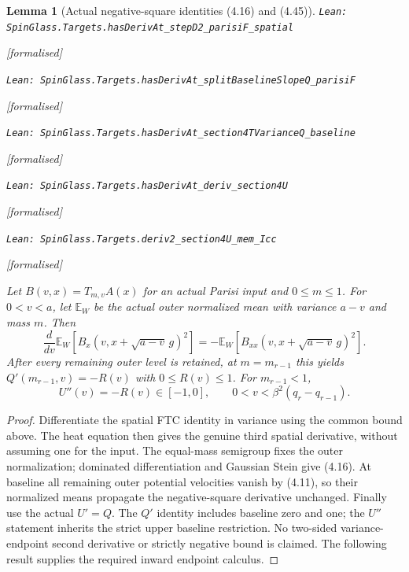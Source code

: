 \documentclass[11pt]{article}
\providecommand{\lean}[1]{\leavevmode\par\nopagebreak
  {\noindent\normalfont\footnotesize\raggedright\texttt{Lean: #1}\par}\nopagebreak}
\providecommand{\leanok}{\par\nopagebreak
  {\noindent\normalfont\footnotesize\textcolor{green!50!black}{[formalised]}\par}\nopagebreak}
\newtheorem{lemma}[theorem]{Lemma}
\begin{document}
\begin{lemma}[Actual negative-square identities (4.16) and (4.45)]
\lean{SpinGlass.Targets.hasDerivAt\_stepD2\_parisiF\_spatial}\leanok
\lean{SpinGlass.Targets.hasDerivAt\_splitBaselineSlopeQ\_parisiF}\leanok
\lean{SpinGlass.Targets.hasDerivAt\_section4TVarianceQ\_baseline}\leanok
\lean{SpinGlass.Targets.hasDerivAt\_deriv\_section4U}\leanok
\lean{SpinGlass.Targets.deriv2\_section4U\_mem\_Icc}\leanok
Let $B(v,x)=T_{m,v}A(x)$ for an actual Parisi input and $0\le m\le1$.
For $0<v<a$, let $\mathbb E_W$ be the actual outer normalized mean with
variance $a-v$ and mass $m$. Then
\[
 \frac d{dv}\mathbb E_W[B_x(v,x+\sqrt{a-v}\,g)^2]
 =-\mathbb E_W[B_{xx}(v,x+\sqrt{a-v}\,g)^2].
\]
After every remaining outer level is retained, at $m=m_{r-1}$ this yields
$Q'(m_{r-1},v)=-R(v)$ with $0\le R(v)\le1$. For $m_{r-1}<1$,
\[
 U''(v)=-R(v)\in[-1,0],\qquad 0<v<\beta^2(q_r-q_{r-1}).
\]
\end{lemma}
\begin{proof}
Differentiate the spatial FTC identity in variance using the common bound
above. The heat equation then gives the genuine third spatial derivative,
without assuming one for the input. The equal-mass semigroup fixes the outer
normalization; dominated differentiation and Gaussian Stein give (4.16).
At baseline all remaining outer potential velocities vanish by (4.11), so
their normalized means propagate the negative-square derivative unchanged.
Finally use the actual $U'=Q$. The $Q'$ identity includes baseline zero and
one; the $U''$ statement inherits the strict upper baseline restriction.
No two-sided variance-endpoint second derivative or strictly negative bound is
claimed. The following result supplies the required inward endpoint calculus.
\end{proof}
\end{document}
